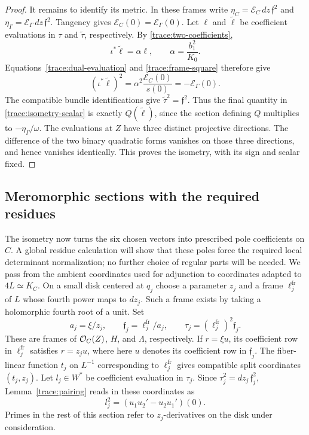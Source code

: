 \begin{proof}
It remains to identify its metric.  In these frames write
$\eta_C=\mathcal E_C\,dz\,\mathfrak f^2$ and
$\eta_\Gamma=\mathcal E_\Gamma\,dz\,\mathfrak f^2$.
Tangency gives $\mathcal E_C(0)=\mathcal E_\Gamma(0)$.
Let $\ell$ and $\widetilde\ell$ be coefficient evaluations in $\tau$
and $\widetilde\tau$, respectively.  By
\eqref{trace:two-coefficients},
\[
 \iota^*\widetilde\ell=\alpha\ell,
 \qquad \alpha=\frac{b_1^2}{K_0}.
\]
Equations~\eqref{trace:dual-evaluation} and
\eqref{trace:frame-square} therefore give
\begin{equation}\label{trace:isometry-scalar}
 (\iota^*\widetilde\ell)^2
     =\alpha^2\frac{\mathcal E_C(0)}{s(0)}
     =-\mathcal E_\Gamma(0).
\end{equation}
The compatible bundle identifications give
$\widetilde\tau^2=\mathfrak f^2$.  Thus the final quantity in
\eqref{trace:isometry-scalar} is exactly $Q(\widetilde\ell)$, since
the section defining $Q$ multiplies to $-\eta_\Gamma/\omega$.
The evaluations at $Z$ have three distinct projective directions.
The difference of the two binary quadratic forms vanishes on those
three directions, and hence vanishes identically.  This proves the
isometry, with its sign and scalar fixed.
\end{proof}

\subsection{Meromorphic sections with the required residues}

The isometry now turns the six chosen vectors into prescribed pole
coefficients on $C$.  A global residue calculation will show that these
poles force the required local determinant normalization; no further
choice of regular parts will be needed.
We pass from the ambient coordinates used for adjunction to coordinates
adapted to $4L\simeq K_C$.  On a small disk centered at $q_j$ choose
a parameter $z_j$ and a frame $\ell_j^{\mathrm{fr}}$ of $L$ whose fourth
power maps to $dz_j$.  Such a frame exists by taking a holomorphic fourth
root of a unit.  Set
\[
 a_j=\xi/z_j,\qquad
 \mathfrak f_j=\ell_j^{\mathrm{fr}}/a_j,
 \qquad \tau_j=(\ell_j^{\mathrm{fr}})^2\mathfrak f_j.
\]
These are frames of $\mathcal O_C(Z)$, $H$, and $\Lambda$, respectively.
If $r=\xi u$, its coefficient row in $\ell_j^{\mathrm{fr}}$ satisfies
$r=z_j u$, where here $u$ denotes its coefficient row in
$\mathfrak f_j$.  The fiber-linear function $t_j$ on $L^{-1}$
corresponding to $\ell_j^{\mathrm{fr}}$ gives compatible split
coordinates $(t_j,z_j)$.  Let $l_j\in W^*$ be coefficient evaluation
in $\tau_j$.  Since $\tau_j^2=dz_j\,\mathfrak f_j^2$,
Lemma~\ref{trace:pairing} reads in these coordinates as
\begin{equation}\label{trace:compatible-norm}
 l_j^2=(u_1u_2'-u_2u_1')(0).
\end{equation}
Primes in the rest of this section refer to $z_j$-derivatives on the
disk under consideration.

